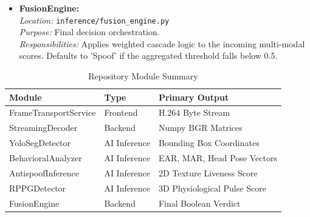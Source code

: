\begin{itemize}
    \item \textbf{FusionEngine:} \\
    \textit{Location:} \texttt{inference/fusion\_engine.py} \\
    \textit{Purpose:} Final decision orchestration. \\
    \textit{Responsibilities:} Applies weighted cascade logic to the incoming multi-modal scores. Defaults to 'Spoof' if the aggregated threshold falls below 0.5.
\end{itemize}

\begin{table}[H]
\centering
\caption{Repository Module Summary}
\begin{tabularx}{\textwidth}{|l|l|X|}
\hline
\textbf{Module} & \textbf{Type} & \textbf{Primary Output} \\
\hline
FrameTransportService & Frontend & H.264 Byte Stream \\
StreamingDecoder & Backend & Numpy BGR Matrices \\
YoloSegDetector & AI Inference & Bounding Box Coordinates \\
BehavioralAnalyzer & AI Inference & EAR, MAR, Head Pose Vectors \\
AntispoofInference & AI Inference & 2D Texture Liveness Score \\
RPPGDetector & AI Inference & 3D Physiological Pulse Score \\
FusionEngine & Backend & Final Boolean Verdict \\
\hline
\end{tabularx}
\end{table}